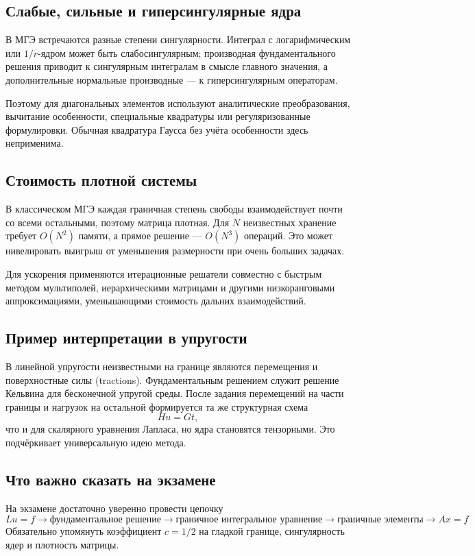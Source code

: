 \subsection{Слабые, сильные и гиперсингулярные ядра}

В МГЭ встречаются разные степени сингулярности. Интеграл с логарифмическим или
$1/r$-ядром может быть слабосингулярным; производная фундаментального решения
приводит к сингулярным интегралам в смысле главного значения, а дополнительные
нормальные производные --- к гиперсингулярным операторам.

Поэтому для диагональных элементов используют аналитические преобразования,
вычитание особенности, специальные квадратуры или регуляризованные
формулировки. Обычная квадратура Гаусса без учёта особенности здесь
неприменима.

\subsection{Стоимость плотной системы}

В классическом МГЭ каждая граничная степень свободы взаимодействует почти со
всеми остальными, поэтому матрица плотная. Для $N$ неизвестных хранение требует
$O(N^2)$ памяти, а прямое решение --- $O(N^3)$ операций. Это может нивелировать
выигрыш от уменьшения размерности при очень больших задачах.

Для ускорения применяются итерационные решатели совместно с быстрым методом
мультиполей, иерархическими матрицами и другими низкоранговыми аппроксимациями,
уменьшающими стоимость дальних взаимодействий.

\subsection{Пример интерпретации в упругости}

В линейной упругости неизвестными на границе являются перемещения и поверхностные
силы (tractions). Фундаментальным решением служит решение Кельвина для
бесконечной упругой среды. После задания перемещений на части границы и нагрузок
на остальной формируется та же структурная схема
\[
Hu=Gt,
\]
что и для скалярного уравнения Лапласа, но ядра становятся тензорными.
Это подчёркивает универсальную идею метода.


\subsection{Что важно сказать на экзамене}

На экзамене достаточно уверенно провести цепочку
\[
\boxed{
Lu=f
\rightarrow
\text{фундаментальное решение}
\rightarrow
\text{граничное интегральное уравнение}
\rightarrow
\text{граничные элементы}
\rightarrow
Ax=f}.
\]
Обязательно упомянуть коэффициент $c=1/2$ на гладкой границе, сингулярность ядер и плотность матрицы.

\newpage
